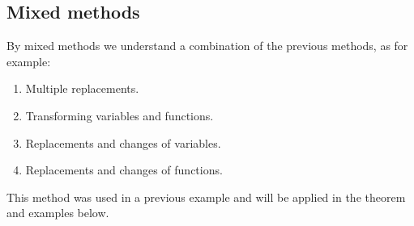 \documentclass[
	11pt, %
	fleqn, %
	a4paper, %
]{LegrandOrangeBook}
\begin{document}
\subsection{Mixed methods}\label{s2.11} By mixed methods we understand a
combination of the previous methods, as for example:
\begin{enumerate}
\item Multiple replacements.

\item Transforming variables and functions.

\item Replacements and changes of variables.

\item Replacements and changes of functions.

\end{enumerate}

This method was used in a previous example and will be applied in the theorem and
examples below.
\end{document}
